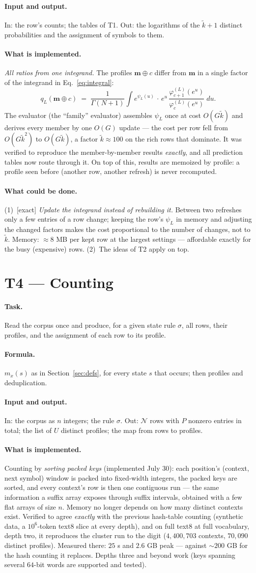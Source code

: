 \documentclass[11pt]{article}
\newcommand{\prof}{\mathbf{m}}
\newcommand{\field}[1]{\paragraph{#1.}}
\begin{document}
\field{Input and output}
In: the row's counts; the tables of T1.  Out: the logarithms of the
$\tilde k + 1$ distinct probabilities and the assignment of symbols
to them.

\field{What is implemented}
\emph{All ratios from one integrand.}  The profiles
$\prof \oplus c$ differ from $\prof$ in a single factor of the
integrand in Eq.~\eqref{eq:integral}:
\[
  q_L(\prof \oplus c) \;=\; \frac{1}{\Gamma(N+1)} \int
  e^{\psi_L(u)}\, \cdot\, e^{u}\,
  \frac{\varphi^{(L)}_{c+1}(e^u)}{\varphi^{(L)}_{c}(e^u)}\; du .
\]
The evaluator (the ``family'' evaluator) assembles $\psi_L$ once at
cost $O(G\tilde k)$ and derives every member by one $O(G)$ update
--- the cost per row fell from $O(G \tilde k^{2})$ to
$O(G \tilde k)$, a factor $\tilde k \approx 100$ on the rich rows
that dominate.  It was verified to reproduce the member-by-member
results \emph{exactly}, and all prediction tables now route through
it.  On top of this, results are memoized by profile: a profile seen
before (another row, another refresh) is never recomputed.

\field{What could be done}
(1)~[exact] \emph{Update the integrand instead of rebuilding it.}
Between two refreshes only a few entries of a row change; keeping
the row's $\psi_L$ in memory and adjusting the changed factors makes
the cost proportional to the number of changes, not to $\tilde k$.
Memory: $\approx 8$ MB per kept row at the largest settings ---
affordable exactly for the busy (expensive) rows.
(2)~The ideas of T2 apply on top.

\section{T4 --- Counting}

\field{Task}
Read the corpus once and produce, for a given state rule $\sigma$,
all rows, their profiles, and the assignment of each row to its
profile.

\field{Formula}
$m_x(s)$ as in Section~\ref{sec:defs}, for every state $s$ that
occurs; then profiles and deduplication.

\field{Input and output}
In: the corpus as $n$ integers; the rule $\sigma$.  Out:
$\mathcal{N}$ rows with $P$ nonzero entries in total; the list of
$U$ distinct profiles; the map from rows to profiles.

\field{What is implemented}
Counting by \emph{sorting packed keys} (implemented July 30): each
position's (context, next symbol) window is packed into fixed-width
integers, the packed keys are sorted, and every context's row is
then one contiguous run --- the same information a suffix array
exposes through suffix intervals, obtained with a few flat arrays of
size $n$.  Memory no longer depends on how many distinct contexts
exist.  Verified to agree \emph{exactly} with the previous
hash-table counting (synthetic data, a $10^6$-token text8 slice at
every depth), and on full text8 at full vocabulary, depth two, it
reproduces the cluster run to the digit ($4{,}400{,}703$ contexts,
$70{,}090$ distinct profiles).  Measured there: $25$ s and
$2.6$ GB peak --- against $\sim 200$ GB for the hash counting it
replaces.  Depths three and beyond work (keys spanning several
$64$-bit words are supported and tested).
\end{document}
